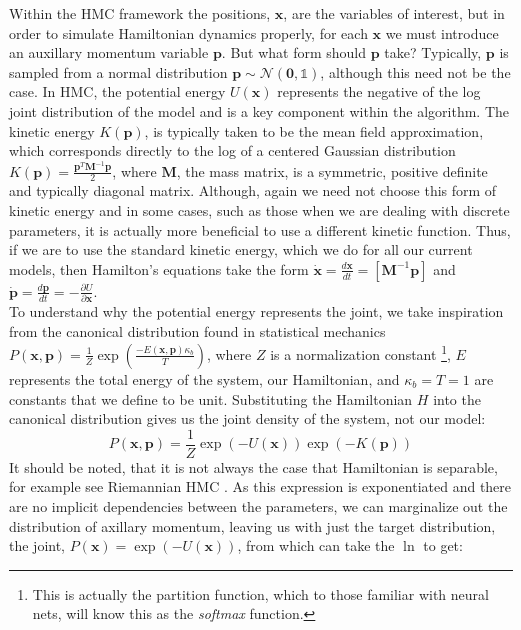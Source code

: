 \documentclass[twoside]{article}
\begin{document}
Within the HMC framework the positions, $\textbf{x}$, are the variables of interest, but in order to simulate Hamiltonian dynamics properly, for each $\textbf{x}$ we must introduce an auxillary momentum variable $\textbf{p}$. But what form should $\textbf{p}$ take? Typically, $\textbf{p}$ is sampled from a normal distribution $\textbf{p} \sim \mathcal{N}(\textbf{0}, \mathds{1})$, although this need not be the case. In HMC, the potential energy $U(\textbf{x})$ represents the negative of the log joint distribution of the model and is a key component within the algorithm.  The kinetic energy $K(\textbf{p})$, is typically taken to be the mean field approximation, which corresponds directly to the log of a centered Gaussian distribution $K(\textbf{p}) = \frac{\textbf{p}^{T} \textbf{M}^{-1} \textbf{p}}{2}$, where $\textbf{M}$, the mass matrix, is a symmetric, positive definite and typically diagonal matrix. Although, again we need not choose this form of kinetic energy and in some cases, such as those when we are dealing with discrete parameters, it is actually more beneficial to use a different kinetic function\citep{nishimura2017discontinuous}. Thus, if we are to use the standard kinetic energy, which we do for all our current models, then Hamilton's equations take the form $
\dot{\textbf{x}} = \frac{d\textbf{x}}{dt} = [\textbf{M}^{-1}\textbf{p}]$ and $ \dot{\textbf{p}} = \frac{d\textbf{p}}{dt} = -\frac{\partial U}{\partial \textbf{x}}$.\\
To understand why the potential energy represents the joint, we take inspiration from the canonical distribution found in statistical mechanics
$P(\textbf{x},\textbf{p}) = \frac{1}{Z}\exp\left(\frac{-E(\textbf{x},\textbf{p})\kappa_{b}}{T}\right)$,
where $Z$ is a normalization constant \footnote{This is actually the partition function, which to those familiar with neural nets, will know this as the \textit{softmax} function. }, $E$ represents the total energy of the system, our Hamiltonian, and $\kappa_{b} = T = 1$ are constants that we define to be unit. Substituting the Hamiltonian $H$ into the canonical distribution gives us the joint density of the system, not our model:
\begin{equation}
P(\textbf{x},\textbf{p}) = \frac{1}{Z}\exp(-U(\textbf{x}))\exp(-K(\textbf{p})) 
\end{equation}
It should be noted, that it is not always the case that Hamiltonian is separable, for example see Riemannian HMC \citep{girolami2011riemann}. As this expression is exponentiated and there are no implicit dependencies between the parameters, we can marginalize out the distribution of axillary momentum, leaving us with just the target distribution, the joint, $P(\textbf{x})  = \exp(-U(\textbf{x}))$, from which can take the $\ln$ to get:
\end{document}
